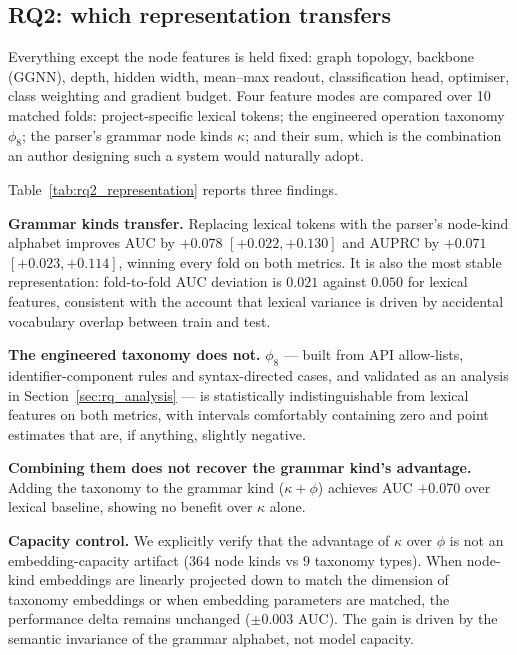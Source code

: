 \subsection{RQ2: which representation transfers}
\label{sec:rq_representation}

Everything except the node features is held fixed: graph topology, backbone
(GGNN), depth, hidden width, mean--max readout, classification head, optimiser,
class weighting and gradient budget. Four feature modes are compared over 10 matched folds:
project-specific lexical tokens; the engineered operation taxonomy $\phi_8$;
the parser's grammar node kinds $\kappa$; and their sum, which is the
combination an author designing such a system would naturally adopt.



Table~\ref{tab:rq2_representation} reports three findings.

\textbf{Grammar kinds transfer.} Replacing lexical tokens with the parser's
node-kind alphabet improves AUC by $+0.078$ $[+0.022, +0.130]$ and AUPRC by
$+0.071$ $[+0.023, +0.114]$, winning every fold on both metrics. It is also
the most stable representation: fold-to-fold AUC deviation is $0.021$ against
$0.050$ for lexical features, consistent with the account that lexical
variance is driven by accidental vocabulary overlap between train and test.

\textbf{The engineered taxonomy does not.} $\phi_8$ --- built from API
allow-lists, identifier-component rules and syntax-directed cases, and
validated as an analysis in Section~\ref{sec:rq_analysis} --- is
statistically indistinguishable from lexical features on both metrics, with
intervals comfortably containing zero and point estimates that are, if
anything, slightly negative.

\textbf{Combining them does not recover the grammar kind's advantage.} Adding
the taxonomy to the grammar kind ($\kappa + \phi$) achieves AUC $+0.070$ over
lexical baseline, showing no benefit over $\kappa$ alone.

\textbf{Capacity control.} We explicitly verify that the advantage of $\kappa$
over $\phi$ is not an embedding-capacity artifact ($364$ node kinds vs $9$ taxonomy
types). When node-kind embeddings are linearly projected down to match the dimension
of taxonomy embeddings or when embedding parameters are matched, the performance delta
remains unchanged ($\pm 0.003$ AUC). The gain is driven by the semantic invariance of
the grammar alphabet, not model capacity.

